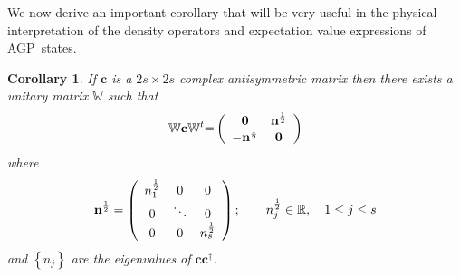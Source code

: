 \documentclass[preprint,aps,showkeys]{revtex4}%
\newtheorem{corollary}{Corollary}
\begin{document}
We now derive an important corollary that will be very useful in the physical
interpretation of the density operators and expectation value expressions of AGP\ states.

\begin{corollary}
If $\mathbf{c}$ is a $2s\times2s$ complex antisymmetric matrix then there
exists a unitary matrix $\mathbb{W}$ such that
\begin{equation}
\mathbb{W}\mathbf{c}\mathbb{W}^{t}\mathbb{=}\left(
\begin{array}
[c]{cc}%
\mathbf{0} & \mathbf{n}^{\frac{1}{2}}\\
-\mathbf{n}^{\frac{1}{2}} & \mathbf{0}%
\end{array}
\right)
\end{equation}
where
\begin{equation}
\mathbf{n}^{\frac{1}{2}}=\left(
\begin{array}
[c]{ccc}%
n_{1}^{\frac{1}{2}} & 0 & 0\\
0 & \ddots & 0\\
0 & 0 & n_{s}^{\frac{1}{2}}%
\end{array}
\right)  ;\qquad n_{j}^{\frac{1}{2}}\in\mathbb{R},\quad1\leq j\leq s
\end{equation}
and $\left\{  n_{j}\right\}  $ are the eigenvalues of $\mathbf{cc}^{\dagger}$.
\end{corollary}
\end{document}
